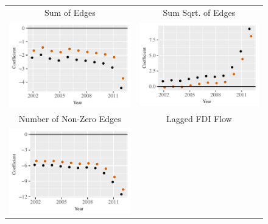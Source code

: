 \documentclass[reqno,onecolumn,letterpaper,12pt]{article}
\begin{document}
\begin{figure}[htp]
\centering
\begin{tabular}{c@{\hskip -.4cm}c}
Sum of Edges&
Sum Sqrt. of Edges\\
\includegraphics[height=.2\textheight, clip=true, trim=0cm .5cm 0cm .1cm]{draft_figures/rl_plots/Sum.pdf}    &
\includegraphics[height=.2\textheight, clip=true, trim=.5cm .5cm 0cm .1cm]{draft_figures/rl_plots/Sum_5.pdf}   \\
Number of Non-Zero Edges &
Lagged FDI Flow\\
\includegraphics[height=.2\textheight, clip=true, trim=0cm .5cm 0cm .1cm]{draft_figures/rl_plots/Nonzero.pdf} &

\end{tabular}
\end{figure}
\end{document}
